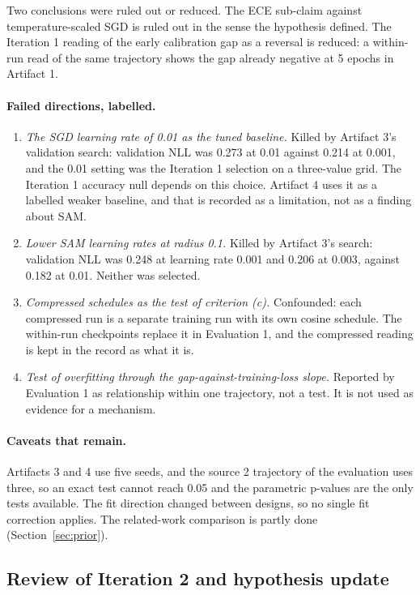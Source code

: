 \documentclass[11pt,letterpaper]{article}
\begin{document}
Two conclusions were ruled out or reduced. The ECE sub-claim against temperature-scaled SGD is ruled out in the sense the hypothesis defined. The Iteration 1 reading of the early calibration gap as a reversal is reduced: a within-run read of the same trajectory shows the gap already negative at 5 epochs in Artifact 1.

\paragraph{Failed directions, labelled.}

\begin{enumerate}
\item \emph{The SGD learning rate of 0.01 as the tuned baseline.} Killed by Artifact 3's validation search: validation NLL was 0.273 at 0.01 against 0.214 at 0.001, and the 0.01 setting was the Iteration 1 selection on a three-value grid. The Iteration 1 accuracy null depends on this choice. Artifact 4 uses it as a labelled weaker baseline, and that is recorded as a limitation, not as a finding about SAM.
\item \emph{Lower SAM learning rates at radius 0.1.} Killed by Artifact 3's search: validation NLL was 0.248 at learning rate 0.001 and 0.206 at 0.003, against 0.182 at 0.01. Neither was selected.
\item \emph{Compressed schedules as the test of criterion (c).} Confounded: each compressed run is a separate training run with its own cosine schedule. The within-run checkpoints replace it in Evaluation 1, and the compressed reading is kept in the record as what it is.
\item \emph{Test of overfitting through the gap-against-training-loss slope.} Reported by Evaluation 1 as relationship within one trajectory, not a test. It is not used as evidence for a mechanism.
\end{enumerate}

\paragraph{Caveats that remain.} Artifacts 3 and 4 use five seeds, and the source 2 trajectory of the evaluation uses three, so an exact test cannot reach 0.05 and the parametric p-values are the only tests available. The fit direction changed between designs, so no single fit correction applies. The related-work comparison is partly done (Section~\ref{sec:prior}).

\subsection{Review of Iteration 2 and hypothesis update}
\end{document}
